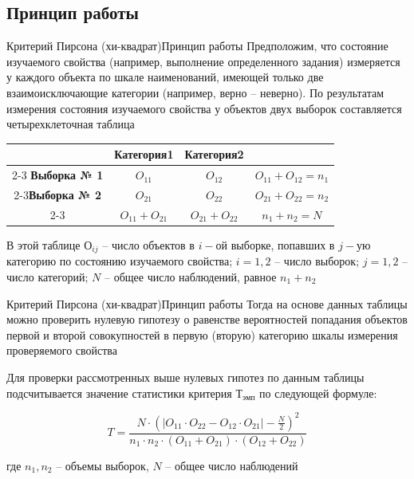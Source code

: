 \documentclass{beamer}
\begin{document}
\subsection{Принцип работы}
\begin{frame}{Критерий Пирсона (хи-квадрат)}{Принцип работы}
    \small
    Предположим, что состояние изучаемого свойства (например, выполнение определенного задания) измеряется у каждого объекта по шкале наименований, имеющей только две взаимоисключающие категории (например, верно – неверно). По результатам измерения состояния изучаемого свойства у объектов двух выборок составляется четырехклеточная таблица

    
    \begin{table}[h]
        \label{tbl:measurement-results}
        \centering
        \begin{tabular}{c|c|c|c} 
             &\textbf{Категория1}&\textbf{Категория2}&  \\
             \cline{2-3} \textbf{Выборка № 1}&\textit{$O_{11}$}&\textit{$O_{12}$}&\textit{$O_{11} + O_{12} = n_1$} \\
             \cline{2-3}\textbf{Выборка № 2}&\textit{$O_{21}$}&\textit{$O_{22}$}&\textit{$O_{21} + O_{22} = n_2$} \\
             \cline{2-3}&\textit{$O_{11} + O_{21}$}&\textit{$O_{21} + O_{22}$}&\textit{$n_1 + n_2 = N$}  \\
        \end{tabular}
    \end{table}
        
    В этой таблице $О_{ij}$ – число объектов в $i-ой$ выборке, попавших в $j-ую$ категорию по состоянию изучаемого свойства; $i=1,2$ – число выборок; $j=1,2$ – число категорий; $N$ – общее число наблюдений, равное  $n_1+n_2$
\end{frame}

\begin{frame}{Критерий Пирсона (хи-квадрат)}{Принцип работы}
    Тогда на основе данных таблицы можно проверить нулевую гипотезу о равенстве вероятностей попадания объектов первой и второй совокупностей в первую (вторую) категорию шкалы измерения проверяемого свойства

    \pause
    \smallskip
    Для проверки рассмотренных выше нулевых гипотез по данным таблицы подсчитывается значение статистики критерия $Т_{эмп}$ по следующей формуле:

    $$
        T=\frac{N\cdot (|O_{11} \cdot O_{22} -O_{12} \cdot O_{21}| - \frac{N}{2})^2}{n_1 \cdot n_2 \cdot (O_{11} + O_{21}) \cdot (O_{12} + O_{22})}
    $$

    где $n_1, n_2$ – объемы выборок, $N$ – общее число наблюдений
\end{frame}
\end{document}

